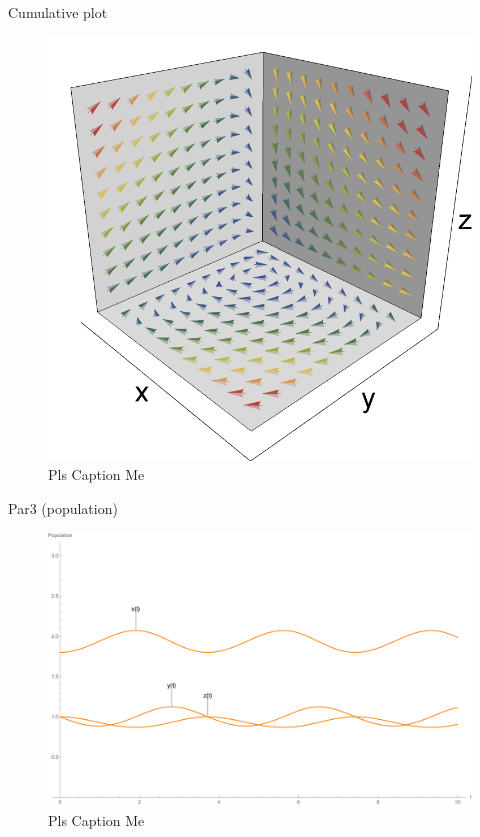 \documentclass[11pt,oneside]{article}
\begin{document}
	Cumulative plot
	\begin{figure}[H]
		\center
		\includegraphics[scale=0.80]{XYZ}
		\caption{Pls Caption Me}
	\end{figure}
	
	
	Par3 (population)
	\begin{figure}[H]
		\center
		\includegraphics[scale=0.5]{par3}
		\caption{Pls Caption Me}
	\end{figure}
	
	
	
	
	
\end{document}
